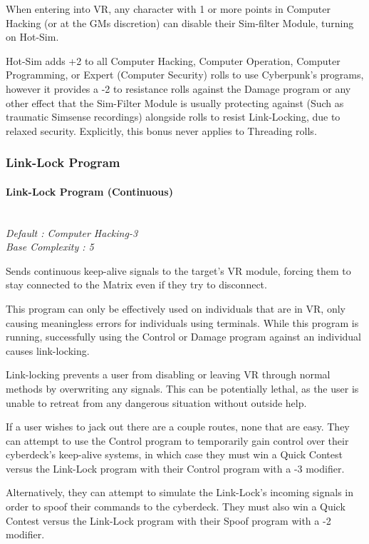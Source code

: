 \begin{multicols}{3}
	When entering into VR, any character with 1 or more points in Computer Hacking (or at the GMs discretion) can disable their Sim-filter Module, turning on Hot-Sim. 
	
	Hot-Sim adds +2 to all Computer Hacking, Computer Operation, Computer Programming, or Expert (Computer Security) rolls to use Cyberpunk's programs, however it provides a -2 to resistance rolls against the Damage program or any other effect that the Sim-Filter Module is usually protecting against (Such as traumatic Simsense recordings) alongside rolls to resist Link-Locking, due to relaxed security. Explicitly, this bonus never applies to Threading rolls.
	
	\subsubsection{Link-Lock Program}
	
	\paragraph{Link-Lock Program (Continuous)}
	
	\textit{\textcolor{NavyBlue}{\\Default : Computer Hacking-3\\
			Base Complexity : 5}}
	
	Sends continuous keep-alive signals to the target’s VR module, forcing them to stay connected to the Matrix even if they try to disconnect. 
	
	This program can only be effectively used on individuals that are in VR, only causing meaningless errors for individuals using terminals. While this program is running, successfully using the Control or Damage program against an individual causes link-locking. 
	
	Link-locking prevents a user from disabling or leaving VR through normal methods by overwriting any signals. This can be potentially lethal, as the user is unable to retreat from any dangerous situation without outside help.
	
	If a user wishes to jack out there are a couple routes, none that are easy. They can attempt to use the Control program to temporarily gain control over their cyberdeck's keep-alive systems, in which case they must win a Quick Contest versus the Link-Lock program with their Control program with a -3 modifier.
	
	Alternatively, they can attempt to simulate the Link-Lock's incoming signals in order to spoof their commands to the cyberdeck. They must also win a Quick Contest versus the Link-Lock program with their Spoof program with a -2 modifier.
	

\end{multicols}
